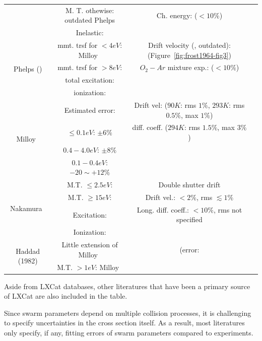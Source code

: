 \documentclass[11pt]{article}
\begin{document}
\begin{tabular}{|c|c|c|c|}
& M. T. othewise: outdated Phelps\cite{Frost1964} & Ch. energy: \cite{Dutton1975,Milloy1977ratio,Lakshminarasimha1977} ($<10\%$) \\
& Inelastic: \cite{Bretagne1986} & \\
\hline
\multirow{4}{*}{Phelps (\cite{Frost1964,Tachibana1981})} & mmt. trsf for $<4eV$: Milloy~\cite{Milloy1977}
 & Drift velocity (\cite{Frost1964}, outdated): \cite{Warren1962,Townsend1922,Pack1961,Bowe1960,Nielsen1936,Haddad1982} (Figure~\ref{fig:frost1964-fig3}) \\
 & mmt. trsf for $>8eV$: \cite{Fletcher1972}& $O_2-Ar$ mixture exp.: \cite{Tachibana1981} ($<10\%$)\\
 & total excitation: \cite{Schaper1969} & \\
 & ionization: \cite{Smith1930} & \\
\hline
\multirow{4}{*}{Milloy~\cite{Milloy1977}} & Estimated error: & Drift vel: \cite{Robertson1977} ($90K$: rms $1\%$, $293K$: rms $0.5\%$, max $1\%$) \\
& $\le0.1eV$: $\pm6\%$ & diff. coeff. \cite{Milloy1977ratio} ($294K$: rms $1.5\%$, max $3\%$) \\
& $0.4-4.0eV$: $\pm8\%$ & \\
& $0.1-0.4eV$: $-20\sim+12\%$ & \\
\hline
\multirow{4}{*}{Nakamura~\cite{Nakamura1988}} & M.T. $\le2.5eV$: \cite{Milloy1977} & Double shutter drift \cite[Figure 5]{Nakamura1988}\\
& M.T. $\ge15eV$: \cite{Fon1983} & Drift vel.: $<2\%$, rms $\lesssim1\%$ \\
& Excitation: \cite{Ferreira1983} & Long. diff. coeff.: $<10\%$, rms not specified \\
& Ionization: \cite{Rapp1965} & \\
\hline
\multirow{2}{*}{Haddad (1982) \cite{Haddad1982}} & Little extension of Milloy~\cite{Milloy1977} & \cite{Robertson1977,Milloy1977ratio} (error: \cite[Fig 3]{Haddad1982}\\
& M.T. $>1eV$: Milloy~\cite{Milloy1977} & \\
\hline
\end{tabular}
Aside from LXCat databases,
other literatures that have been a primary source of LXCat are also included in the table.
\par
Since swarm parameters depend on multiple collision processes,
it is challenging to specify uncertainties in the cross section itself.
As a result, most literatures only specify, if any, fitting errors of swarm parameters compared to experiments.
\end{document}
